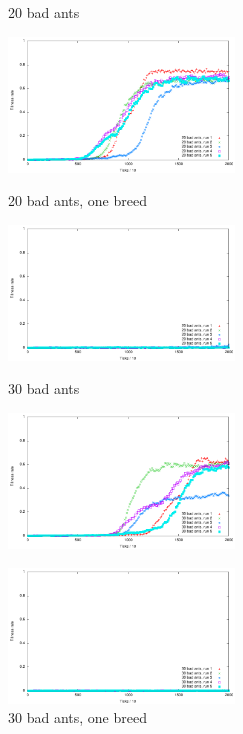 \documentclass[titlepage, a4paper, 12pt]{article}
\begin{document}
\begin{figure}[H]
  \hspace{0.5cm}

  \begin{minipage}[b]{0.5\linewidth}
    \centering
    \caption{20 bad ants }\label{fig:images/graph20}
    \includegraphics[width=6cm]{images/graph20.pdf}
  \end{minipage}
  \begin{minipage}[b]{0.5\linewidth}
    \centering
    \caption{20 bad ants, one breed }\label{fig:images/graph20oneBreed}
    \includegraphics[width=6cm]{images/graph20oneBreed.pdf}
  \end{minipage}
  
  \hspace{0.5cm}

  \begin{minipage}[b]{0.5\linewidth}
    \centering
    \caption{30 bad ants }\label{fig:images/graph30}
    \includegraphics[width=6cm]{images/graph30.pdf}
  \end{minipage}
  \begin{minipage}[b]{0.5\linewidth}
    \centering
    \caption{30 bad ants, one breed }\label{fig:images/graph30oneBreed}
    \includegraphics[width=6cm]{images/graph30oneBreed.pdf}
  \end{minipage}
  
\end{figure}
\end{document}
